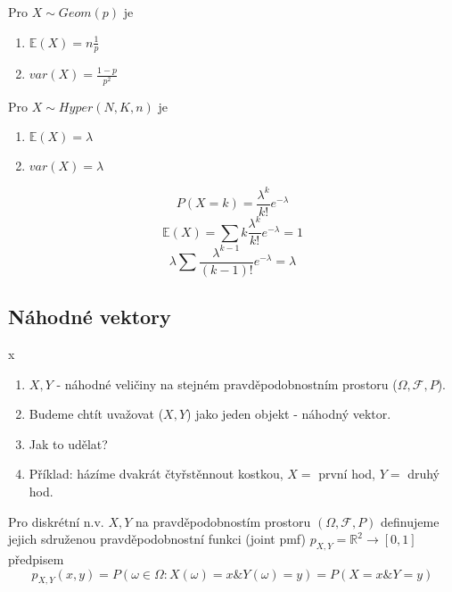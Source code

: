 \documentclass[../main.tex]{subfiles}
\begin{document}
\begin{theorem}
    Pro $X\sim Geom(p)$ je
    \begin{enumerate}
        \item $\mathbb{E}(X) = n\frac{1}{p}$
        \item $var(X) = \frac{1-p}{p^2}$
    \end{enumerate}
\end{theorem}

\begin{theorem}
    Pro $X\sim Hyper(N,K,n)$ je
    \begin{enumerate}
        \item $\mathbb{E}(X) = \lambda$
        \item $var(X) = \lambda$
    \end{enumerate}
    \[P(X=k) = \frac{\lambda^k}{k!}e^{-\lambda}\]
    \[\mathbb{E}(X) = \sum k \frac{\lambda^k}{k!}e^{-\lambda} = 1\]
    \[\lambda \sum \frac{\lambda^{k-1}}{(k-1)!}e^{-\lambda} = \lambda\]    
\end{theorem}
\subsection{Náhodné vektory}
\begin{definition}
    {\color{white} x}
    \begin{enumerate}
        \item $X,Y$ - náhodné veličiny na stejném pravděpodobnostním prostoru ($\Omega, \mathcal{F},P$).
        \item Budeme chtít uvažovat ($X,Y$) jako jeden objekt - náhodný vektor.
        \item Jak to udělat?
        \item Příklad: házíme dvakrát čtyřstěnnout kostkou, $X = $ první hod, $Y = $ druhý hod.
    \end{enumerate}
\end{definition}

\begin{definition}
    Pro diskrétní n.v. $X,Y$ na pravděpodobnostím prostoru $(\Omega, \mathcal{F},P)$ definujeme jejich sdruženou pravděpodobnostní funkci
    (joint pmf) $p_{X,Y} = \mathbb{R}^2 \rightarrow [0,1]$ předpisem
    \[p_{X,Y} (x,y) = P({\omega \in \Omega : X(\omega) = x\& Y(\omega) = y}) = P(X = x \& Y = y)\]
\end{definition}
\end{document}
